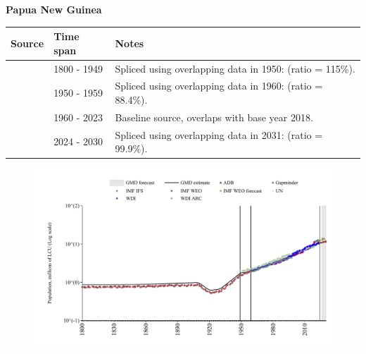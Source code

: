 \documentclass[12pt,a4paper,landscape]{article}
\begin{document}
\begin{adjustbox}{max totalsize={\paperwidth}{\paperheight},center}
\begin{minipage}[t][\textheight][t]{\textwidth}
\vspace*{0.5cm}
{}
\begin{center}
{\Large\bfseries Papua New Guinea}
\end{center}
\vspace{0.5cm}
\begin{table}[H]
\centering
\small
\begin{tabular}{|l|l|l|}
\hline
\textbf{Source} & \textbf{Time span} & \textbf{Notes} \\
\hline
\rowcolor{white}\cite{Gapminder}& 1800 - 1949 &Spliced using overlapping data in 1950: (ratio = 115\%).\\
\rowcolor{lightgray}\cite{IMF_IFS}& 1950 - 1959 &Spliced using overlapping data in 1960: (ratio = 88.4\%).\\
\rowcolor{white}\cite{WDI}& 1960 - 2023 &Baseline source, overlaps with base year 2018.\\
\rowcolor{lightgray}\cite{Gapminder}& 2024 - 2030 &Spliced using overlapping data in 2031: (ratio = 99.9\%).\\
\hline
\end{tabular}
\end{table}
\begin{figure}[H]
\centering
\includegraphics[width=\textwidth,height=0.6\textheight,keepaspectratio]{graphs/PNG_pop.pdf}
\end{figure}
\end{minipage}
\end{adjustbox}
\end{document}
